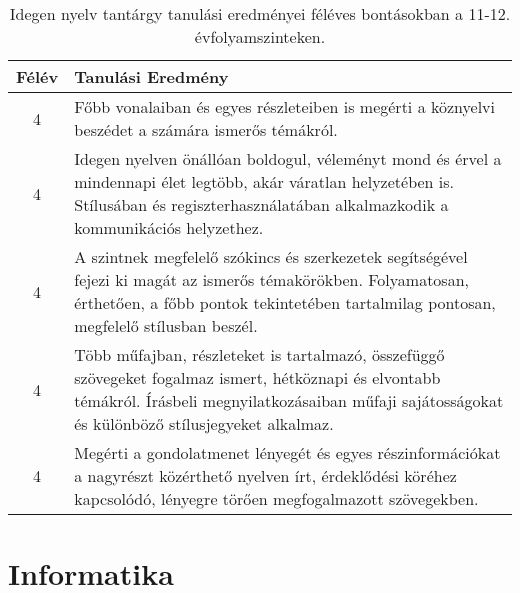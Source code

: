        
           \begin{longtable}{c | p{12cm} }
            \caption[Idegen nyelv 11-12.]{Idegen nyelv tantárgy tanulási eredményei féléves bontásokban a 11-12. évfolyamszinteken. }  \\

            \textbf{Félév} & \textbf{Tanulási Eredmény} \\
            \hline
            \endhead
                                
                                          4 &  Főbb vonalaiban és egyes részleteiben is megérti a köznyelvi beszédet a számára ismerős témákról. \\ \hline
                                          4 &  Idegen nyelven önállóan boldogul, véleményt mond és érvel a mindennapi élet legtöbb, akár váratlan helyzetében is. Stílusában és regiszterhasználatában alkalmazkodik a kommunikációs helyzethez. \\ \hline
                                          4 &  A szintnek megfelelő szókincs és szerkezetek segítségével fejezi ki magát az ismerős témakörökben. Folyamatosan, érthetően, a főbb pontok tekintetében tartalmilag pontosan, megfelelő stílusban beszél. \\ \hline
                                          4 &  Több műfajban, részleteket is tartalmazó, összefüggő szövegeket fogalmaz ismert, hétköznapi és elvontabb témákról. Írásbeli megnyilatkozásaiban műfaji sajátosságokat és különböző stílusjegyeket alkalmaz. \\ \hline
                                          4 &  Megérti a gondolatmenet lényegét és egyes részinformációkat a nagyrészt közérthető nyelven írt, érdeklődési köréhez kapcsolódó, lényegre törően megfogalmazott szövegekben. \\ \hline
                                      
                        \end{longtable}
            \clearpage

        \section{Informatika}

